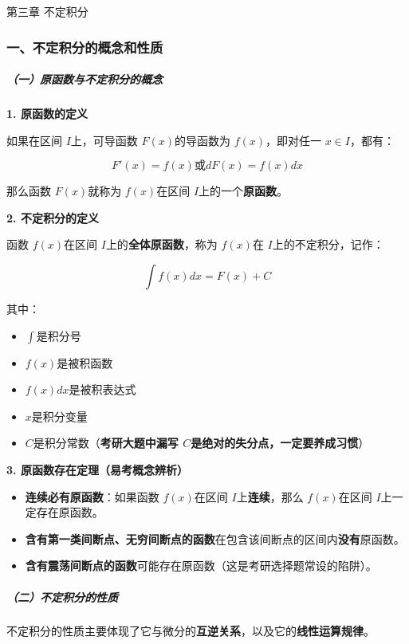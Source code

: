 \documentclass[
]{article}
\author{}
\date{}
\begin{document}
第三章 不定积分

\subsubsection{一、不定积分的概念和性质}\label{ux4e00ux4e0dux5b9aux79efux5206ux7684ux6982ux5ff5ux548cux6027ux8d28}

\subparagraph{（一）原函数与不定积分的概念}\label{ux4e00uxff09ux539fux51fdux6570ux4e0eux4e0dux5b9aux79efux5206ux7684ux6982ux5ff5}

\textbf{1. 原函数的定义}

如果在区间 \(I\)上，可导函数 \(F(x)\)的导函数为 \(f(x)\)，即对任一
\(x \in I\)，都有：

\[F'(x) = f(x)或dF(x) = f(x)dx\]

那么函数 \(F(x)\)就称为 \(f(x)\)在区间 \(I\)上的一个\textbf{原函数}。

\textbf{2. 不定积分的定义}

函数 \(f(x)\)在区间 \(I\)上的\textbf{全体原函数}，称为 \(f(x)\)在
\(I\)上的不定积分，记作：

\[\int f(x) dx = F(x) + C\]

其中：

\begin{itemize}
\item
  \(\int\)是积分号
\item
  \(f(x)\)是被积函数
\item
  \(f(x)dx\)是被积表达式
\item
  \(x\)是积分变量
\item
  \(C\)是积分常数（\textbf{考研大题中漏写
  \(C\)是绝对的失分点，一定要养成习惯}）
\end{itemize}

\textbf{3. 原函数存在定理（易考概念辨析）}

\begin{itemize}
\item
  \textbf{连续必有原函数}：如果函数 \(f(x)\)在区间
  \(I\)上\textbf{连续}，那么 \(f(x)\)在区间 \(I\)上一定存在原函数。
\item
  \textbf{含有第一类间断点、无穷间断点的函数}在包含该间断点的区间内\textbf{没有}原函数。
\item
  \textbf{含有震荡间断点的函数}可能存在原函数（这是考研选择题常设的陷阱）。
\end{itemize}

\subparagraph{（二）不定积分的性质}\label{ux4e8cuxff09ux4e0dux5b9aux79efux5206ux7684ux6027ux8d28}

不定积分的性质主要体现了它与微分的\textbf{互逆关系}，以及它的\textbf{线性运算规律}。
\end{document}
